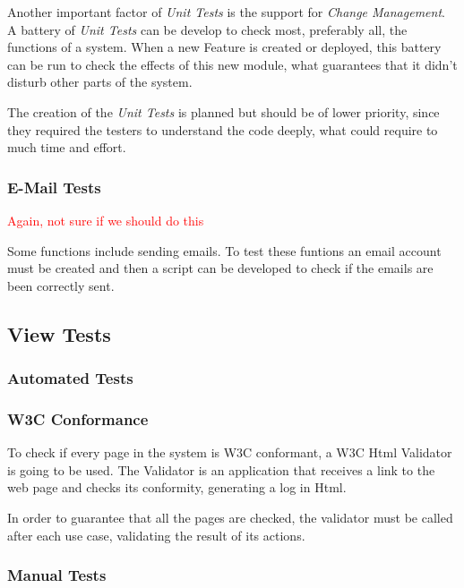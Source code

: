 \documentclass[11pt]{article}
\begin{document}
Another important factor of {\it Unit Tests} is the support for {\it Change Management}. A battery of {\it Unit Tests} can be develop to check most, preferably all, the functions of a system. When a new Feature is created or deployed, this battery can be run to check the effects of this new module, what guarantees that it didn't disturb other parts of the system.

The creation of the {\it Unit Tests} is planned but should be of lower priority, since they required the testers to understand the code deeply, what could require to much time and effort.

\subsubsection*{E-Mail Tests}

\indent

\textcolor{red}{Again, not sure if we should do this}

Some functions include sending emails. To test these funtions an email account must be created and then a script can be developed to check if the emails are been correctly sent.


\subsection{View Tests}

\indent

\subsubsection{Automated Tests}

\subsubsection*{W3C Conformance}

\indent

To check if every page in the system is W3C conformant, a W3C Html Validator is going to be used. The Validator is an application that receives a link to the web page and checks its conformity, generating a log in Html.

In order to guarantee that all the pages are checked, the validator must be called after each use case, validating the result of its actions.

\subsubsection{Manual Tests}
\end{document}
